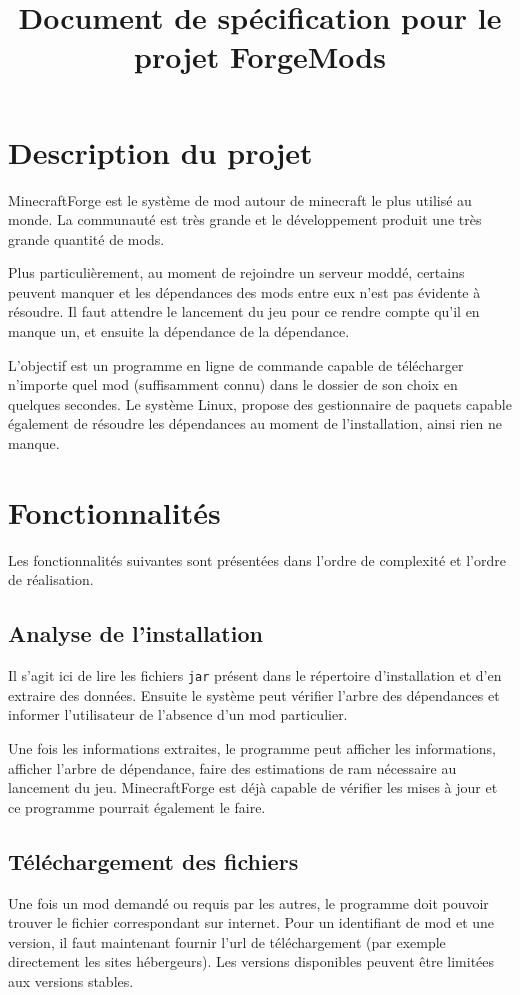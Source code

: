 \documentclass{article}
\title{Document de spécification pour le projet ForgeMods}
\begin{document}
\maketitle
\tableofcontents

\section{Description du projet}
MinecraftForge est le système de mod autour de minecraft le plus utilisé au monde.
La communauté est très grande et le développement produit une très grande quantité de mods.

Plus particulièrement, au moment de rejoindre un serveur moddé, certains peuvent manquer et les dépendances des mods entre eux n'est pas évidente à résoudre.
Il faut attendre le lancement du jeu pour ce rendre compte qu'il en manque un, et ensuite la dépendance de la dépendance.

L'objectif est un programme en ligne de commande capable de télécharger n'importe quel mod (suffisamment connu) dans le dossier de son choix en quelques secondes.
Le système Linux, propose des gestionnaire de paquets capable également de résoudre les dépendances au moment de l'installation, ainsi rien ne manque.


\section{Fonctionnalités}
Les fonctionnalités suivantes sont présentées dans l'ordre de complexité et l'ordre de réalisation.

\subsection{Analyse de l'installation}
Il s'agit ici de lire les fichiers \texttt{jar} présent dans le répertoire d'installation et d'en extraire des données.
Ensuite le système peut vérifier l'arbre des dépendances et informer l'utilisateur de l'absence d'un mod particulier.

Une fois les informations extraites, le programme peut afficher les informations, afficher l'arbre de dépendance, faire des estimations de ram nécessaire au lancement du jeu.
MinecraftForge est déjà capable de vérifier les mises à jour et ce programme pourrait également le faire.


\subsection{Téléchargement des fichiers}
Une fois un mod demandé ou requis par les autres, le programme doit pouvoir trouver le fichier correspondant sur internet.
Pour un identifiant de mod et une version, il faut maintenant fournir l'url de téléchargement (par exemple directement les sites hébergeurs).
Les versions disponibles peuvent être limitées aux versions stables.
\end{document}
